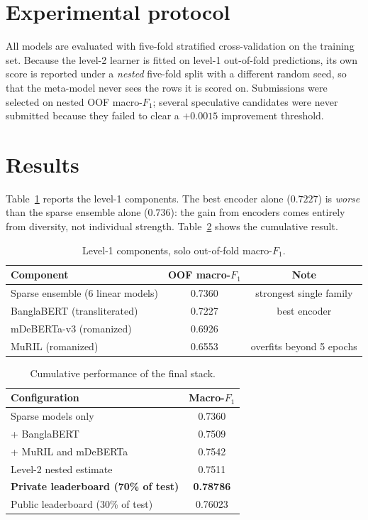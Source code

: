 \documentclass[11pt,a4paper]{article}
\newcommand{\best}[1]{\textbf{#1}}
\begin{document}
\section{Experimental protocol}

All models are evaluated with five-fold stratified cross-validation on the training set. Because the
level-2 learner is fitted on level-1 out-of-fold predictions, its own score is reported under a
\emph{nested} five-fold split with a different random seed, so that the meta-model never sees the
rows it is scored on. Submissions were selected on nested OOF macro-$F_1$; several speculative
candidates were never submitted because they failed to clear a $+0.0015$ improvement threshold.

\section{Results}\label{sec:results}

Table~\ref{tab:solo} reports the level-1 components. The best encoder alone ($0.7227$) is
\emph{worse} than the sparse ensemble alone ($0.736$): the gain from encoders comes entirely from
diversity, not individual strength. Table~\ref{tab:final} shows the cumulative result.

\begin{table}[t]
\centering
\caption{Level-1 components, solo out-of-fold macro-$F_1$.}
\label{tab:solo}
\small
\begin{tabular}{lcc}
\toprule
Component & OOF macro-$F_1$ & Note \\
\midrule
Sparse ensemble (6 linear models) & 0.7360 & strongest single family \\
BanglaBERT (transliterated) & 0.7227 & best encoder \\
mDeBERTa-v3 (romanized) & 0.6926 & \\
MuRIL (romanized) & 0.6553 & overfits beyond 5 epochs \\
\bottomrule
\end{tabular}
\end{table}

\begin{table}[t]
\centering
\caption{Cumulative performance of the final stack.}
\label{tab:final}
\small
\begin{tabular}{lc}
\toprule
Configuration & Macro-$F_1$ \\
\midrule
Sparse models only & 0.7360 \\
+ BanglaBERT & 0.7509 \\
+ MuRIL and mDeBERTa & 0.7542 \\
Level-2 nested estimate & 0.7511 \\
\midrule
\textbf{Private leaderboard (70\% of test)} & \best{0.78786} \\
Public leaderboard (30\% of test) & 0.76023 \\
\bottomrule
\end{tabular}
\end{table}
\end{document}
